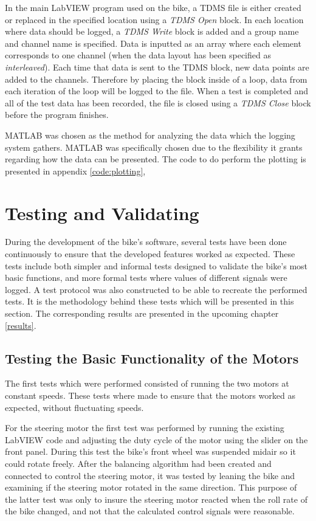 In the main LabVIEW program used on the bike, a TDMS file is either created or replaced in the specified location using a \textit{TDMS Open} block. In each location where data should be logged, a \textit{TDMS Write} block is added and a group name and channel name is specified. Data is inputted as an array where each element corresponds to one channel (when the data layout has been specified as \textit{interleaved}). Each time that data is sent to the TDMS block, new data points are added to the channels. Therefore by placing the block inside of a loop, data from each iteration of the loop will be logged to the file. When a test is completed and all of the test data has been recorded, the file is closed using a \textit{TDMS Close} block before the program finishes.

MATLAB was chosen as the method for analyzing the data which the logging system gathers. MATLAB was specifically chosen due to the flexibility it grants regarding how the data can be presented. The code to do perform the plotting is presented in appendix \ref{code:plotting},

\section{Testing and Validating}

During the development of the bike's software, several tests have been done continuously to ensure that the developed features worked as expected. These tests include both simpler and informal tests designed to validate the bike's most basic functions, and more formal tests where values of different signals were logged. A test protocol was also constructed to be able to recreate the performed tests. It is the methodology behind these tests which will be presented in this section. The corresponding results are presented in the upcoming chapter \ref{results}.

\subsection{Testing the Basic Functionality of the Motors}

The first tests which were performed consisted of running the two motors at constant speeds. These tests where made to ensure that the motors worked as expected, without fluctuating speeds. 

For the steering motor the first test was performed by running the existing LabVIEW code and adjusting the duty cycle of the motor using the slider on the front panel. During this test the bike's front wheel was suspended midair so it could rotate freely. After the balancing algorithm had been created and connected to control the steering motor, it was tested by leaning the bike and examining if the steering motor rotated in the same direction. This purpose of the latter test was only to insure the steering motor reacted when the roll rate of the bike changed, and not that the calculated control signals were reasonable.

